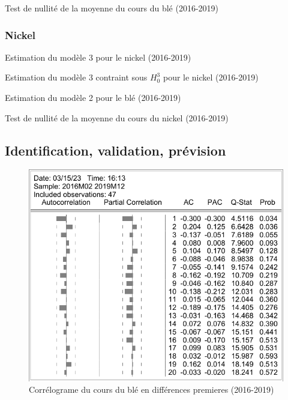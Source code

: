 \documentclass[12pt,a4paper]{article}
\begin{document}
\begin{table}[H]
    \centering
    \caption{Test de nullité de la moyenne du cours du blé (2016-2019)}
    \label{tab:testmoy_ble19}
    \sffamily
    
\end{table}

\subsubsection*{Nickel}
\begin{table}[H]
    \centering
    \caption{Estimation du modèle 3 pour le nickel (2016-2019)}
    \label{tab:mod3_nickel19}
    \sffamily
    
\end{table}

\begin{table}[H]
    \centering
    \caption{Estimation du modèle 3 contraint sous $H_{0}^{3}$ pour le nickel (2016-2019)}
    \label{tab:mod3cont_nickel19}
    \sffamily
    
\end{table}

\begin{table}[H]
    \centering
    \caption{Estimation du modèle 2 pour le blé (2016-2019)}
    \label{tab:mod2_nickel19}
    \sffamily
    
\end{table}

\begin{table}[H]
    \centering
    \caption{Test de nullité de la moyenne du cours du nickel (2016-2019)}
    \label{tab:testmoy_nickel19}
    \sffamily
    
\end{table}

\subsection{Identification, validation, prévision}

\begin{figure}[H]
    \centering
    \includegraphics[]{annexe/4_3_1_cor_dble19.pdf}
    \caption{Corrélograme du cours du blé en différences premieres (2016-2019)}
    \label{fig:cor_dble19}
\end{figure}

\printbibliography
\end{document}
